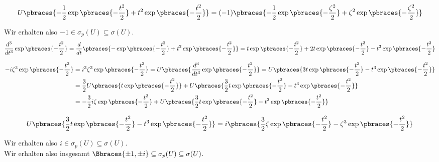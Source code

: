 \begin{solution}
\begin{align*}
  U \pbraces
  {
    -\frac{1}{2}
    \exp \pbraces{-\frac{t^2}{2}} +
    t^2 \exp \pbraces{-\frac{t^2}{2}}
  }
  =
  (-1) \pbraces
  {
    -\frac{1}{2}
    \exp \pbraces{-\frac{\zeta^2}{2}} +
    \zeta^2
    \exp \pbraces{-\frac{\zeta^2}{2}}
  }
\end{align*}

Wir erhalten also $-1 \in \sigma_p(U) \subseteq \sigma(U)$. \\

\begin{align*}
  \frac{d^3}{dt^3}
  \exp \pbraces{-\frac{t^2}{2}}
  =
  \frac{d}{dt}
  \pbraces
  {
    -\exp \pbraces{-\frac{t^2}{2}} +
    t^2 \exp \pbraces{-\frac{t^2}{2}}
  }
  =
  t \exp \pbraces{-\frac{t^2}{2}} +
  2 t \exp \pbraces{-\frac{t^2}{2}} -
  t^3 \exp \pbraces{-\frac{t^2}{2}}
\end{align*}

\begin{align*}
  -i \zeta^3 \exp \pbraces{-\frac{t^2}{2}}
  & =
  i^3 \zeta^3 \exp \pbraces{-\frac{t^2}{2}}
  =
  U \pbraces
  {
    \frac{d^3}{dt^3}
    \exp \pbraces{-\frac{t^2}{2}}
  }
  =
  U \pbraces
  {
    3 t \exp \pbraces{-\frac{t^2}{2}} -
    t^3 \exp \pbraces{-\frac{t^2}{2}}
  } \\
  & =
  \frac{3}{2}
  U \pbraces{t \exp \pbraces{-\frac{t^2}{2}}} +
  U \pbraces
  {
    \frac{3}{2}
    t \exp \pbraces{-\frac{t^2}{2}} -
    t^3 \exp \pbraces{-\frac{t^2}{2}}
  } \\
  & =
  -\frac{3}{2} i \zeta \exp \pbraces{-\frac{t^2}{2}} +
  U \pbraces
  {
    \frac{3}{2}
    t \exp \pbraces{-\frac{t^2}{2}} -
    t^3 \exp \pbraces{-\frac{t^2}{2}}
  }
\end{align*}

\begin{align*}
  U \pbraces
  {
    \frac{3}{2}
    t \exp \pbraces{-\frac{t^2}{2}} -
    t^3 \exp \pbraces{-\frac{t^2}{2}}
  }
  =
  i \pbraces
  {
    \frac{3}{2} \zeta \exp \pbraces{-\frac{t^2}{2}} -
    \zeta^3 \exp \pbraces{-\frac{t^2}{2}}
  }
\end{align*}

Wir erhalten also $i \in \sigma_p(U) \subseteq \sigma(U)$. \\
Wir erhalten also insgesamt $\Bbraces{\pm 1, \pm i} \subseteq \sigma_p(U) \subseteq \sigma(U)$.

\FloatBarrier


\end{solution}
